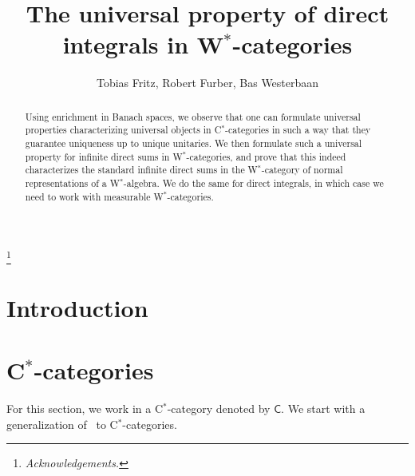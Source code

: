 \documentclass[reqno,T1]{amsproc}
\newcommand{\cat}[1]{\mathsf{#1}}		%
\theoremstyle{plain}
\theoremstyle{remark}
\numberwithin{equation}{section}
\begin{document}
\sloppy

\setlength{\jot}{6pt}



\title{The universal property of direct integrals in W$^*$-categories}

\author{Tobias Fritz, Robert Furber, Bas Westerbaan}

\address{Max Planck Institute for Mathematics in the Sciences, Leipzig, Germany}

\keywords{}


\thanks{\textit{Acknowledgements.} }

\begin{abstract}
Using enrichment in Banach spaces, we observe that one can formulate universal properties characterizing universal objects in C$^*$-categories in such a way that they guarantee uniqueness up to unique unitaries. We then formulate such a universal property for infinite direct sums in W$^*$-categories, and prove that this indeed characterizes the standard infinite direct sums in the W$^*$-category of normal representations of a W$^*$-algebra. We do the same for direct integrals, in which case we need to work with measurable W$^*$-categories.
\end{abstract}

\maketitle

\section{Introduction}


\section{C$^*$-categories}

For this section, we work in a C$^*$-category \cite{wstarcat} denoted by $\cat{C}$.
We start with a generalization of~\cite[Lemma 7]{westerbaan2016universal}
    to C$^*$-categories.
\end{document}
